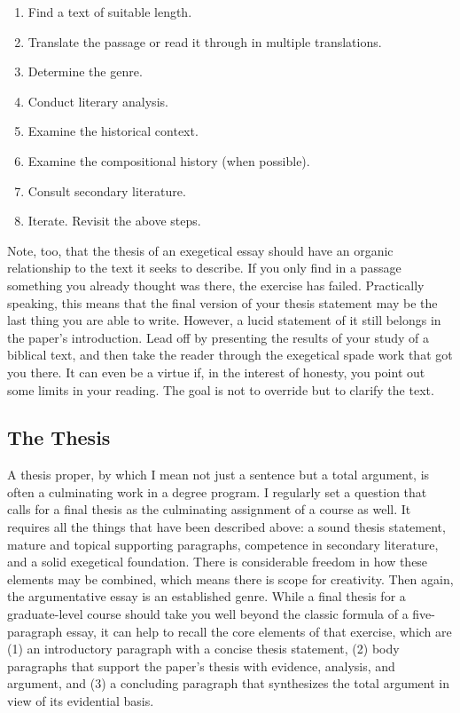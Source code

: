 \documentclass[11pt,twocolumn]{article}
\begin{document}
\begin{enumerate}

\item Find a text of suitable length.

\item Translate the passage or read it through in multiple translations.

\item Determine the genre.

\item Conduct literary analysis.

\item Examine the historical context.

\item Examine the compositional history (when possible).

\item Consult secondary literature.

\item Iterate. Revisit the above steps.

\end{enumerate}

Note, too, that the thesis of an exegetical essay should have an organic
relationship to the text it seeks to describe. If you only find in a
passage something you already thought was there, the exercise has
failed. Practically speaking, this means that the final version of your
thesis statement may be the last thing you are able to write. However, a
lucid statement of it still belongs in the paper's introduction. Lead
off by presenting the results of your study of a biblical text, and then
take the reader through the exegetical spade work that got you there. It
can even be a virtue if, in the interest of honesty, you point out some
limits in your reading. The goal is not to override but to clarify the
text.

\subsection{The Thesis}

A thesis proper, by which I mean not just a sentence but a total
argument, is often a culminating work in a degree program. I regularly
set a question that calls for a final thesis as the culminating
assignment of a course as well. It requires all the things that have
been described above: a sound thesis statement, mature and topical
supporting paragraphs, competence in secondary literature, and a solid
exegetical foundation. There is considerable freedom in how these
elements may be combined, which means there is scope for creativity.
Then again, the argumentative essay is an established genre. While a
final thesis for a graduate-level course should take you well beyond the
classic formula of a five-paragraph essay, it can help to recall the
core elements of that exercise, which are (1) an introductory paragraph
with a concise thesis statement, (2) body paragraphs that support the
paper's thesis with evidence, analysis, and argument, and (3) a
concluding paragraph that synthesizes the total argument in view of its
evidential basis.
\end{document}
